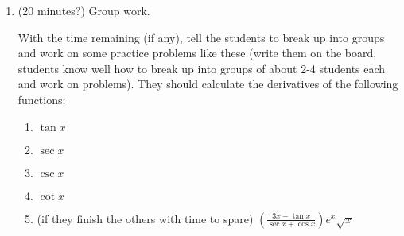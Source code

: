 \documentclass[12pt]{amsart}
\begin{document}
\begin{enumerate}[1. ]
\item (20 minutes?)
Group work.

With the time remaining (if any), tell the students to break up into groups
and work on some practice problems like these (write them on the board,
students know well how to break up into groups of about 2-4 students each
and work on problems). They should calculate the derivatives of the
following functions:
\begin{enumerate}[ i. ]
\item
$\tan x$
\item
$\sec x$
\item
$\csc x$
\item
$\cot x$
\item (if they finish the others with time to spare)
$\displaystyle \left(\frac{3x - \tan x}{\sec x + \cos x}\right) e^x \sqrt x$
\end{enumerate}


\end{enumerate}
\end{document}
